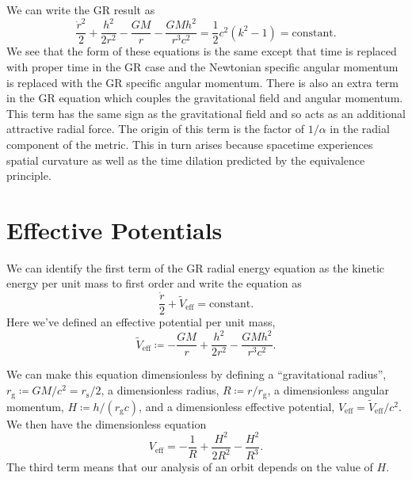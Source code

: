 \documentclass[fleqn]{NotesClass}
\begin{document}
    We can write the GR result as
    \begin{equation}\label{eqn:schwarzschild geodesic}
        \frac{\dot{r}^2}{2} + \frac{h^2}{2r^2} - \frac{GM}{r} - \frac{GMh^2}{r^3c^2} = \frac{1}{2}c^2(k^2 - 1) = \text{constant}.
    \end{equation}
    We see that the form of these equations is the same except that time is replaced with proper time in the GR case and the Newtonian specific angular momentum is replaced with the GR specific angular momentum.
    There is also an extra term in the GR equation which couples the gravitational field and angular momentum.
    This term has the same sign as the gravitational field and so acts as an additional attractive radial force.
    The origin of this term is the factor of \(1/\alpha\) in the radial component of the metric.
    This in turn arises because spacetime experiences spatial curvature as well as the time dilation predicted by the equivalence principle.
    
    \section{Effective Potentials}
    We can identify the first term of the GR radial energy equation as the kinetic energy per unit mass to first order and write the equation as
    \begin{equation}
        \frac{\dot{r}}{2} + \tilde{V}_{\mathrm{eff}} = \text{constant}.
    \end{equation}
    Here we've defined an effective potential per unit mass,
    \begin{equation}
        \tilde{V}_{\mathrm{eff}} \coloneqq -\frac{GM}{r} + \frac{h^2}{2r^2} - \frac{GMh^2}{r^3c^2}.
    \end{equation}
    
    We can make this equation dimensionless by defining a \enquote{gravitational radius}, \(r_{\mathrm{g}} \coloneqq GM/c^2 = r_{\mathrm{s}}/2\), a dimensionless radius, \(R \coloneqq r/r_{\mathrm{g}}\), a dimensionless angular momentum, \(H \coloneqq h / (r_{\mathrm{g}} c)\), and a dimensionless effective potential, \(V_{\mathrm{eff}} = \tilde{V}_{\mathrm{eff}}/c^2\).
    We then have the dimensionless equation
    \begin{equation}
        V_{\mathrm{eff}} = -\frac{1}{R} + \frac{H^2}{2R^2} - \frac{H^2}{R^3}.
    \end{equation}
    The third term means that our analysis of an orbit depends on the value of \(H\).
    
\end{document}

